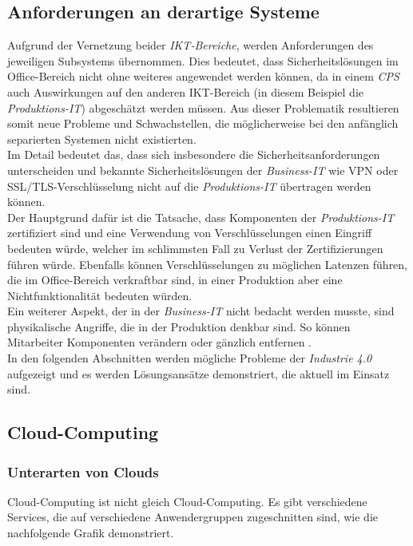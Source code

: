 \documentclass[conference]{IEEEtran}
\begin{document}
\subsection{Anforderungen an derartige Systeme}
Aufgrund der Vernetzung beider \textit{IKT-Bereiche}, werden Anforderungen des jeweiligen Subsystems übernommen. Dies bedeutet, dass Sicherheitslösungen im Office-Bereich nicht ohne weiteres angewendet werden können, da in einem \textit{CPS} auch Auswirkungen auf den anderen IKT-Bereich (in diesem Beispiel die \textit{Produktions-IT}) abgeschätzt werden müssen. Aus dieser Problematik resultieren somit neue Probleme und Schwachstellen, die möglicherweise bei den anfänglich separierten Systemen nicht existierten.\\
Im Detail bedeutet das, dass sich insbesondere die Sicherheitsanforderungen unterscheiden und bekannte Sicherheitslösungen der \textit{Business-IT} wie VPN oder SSL/TLS-Verschlüsselung nicht auf die \textit{Produktions-IT} übertragen werden können.\\
Der Hauptgrund dafür ist die Tatsache, dass Komponenten der \textit{Produktions-IT} zertifiziert sind und eine Verwendung von Verschlüsselungen einen Eingriff bedeuten würde, welcher im schlimmsten Fall zu Verlust der Zertifizierungen führen würde. Ebenfalls können Verschlüsselungen zu möglichen Latenzen führen, die im Office-Bereich verkraftbar sind, in einer Produktion aber eine Nichtfunktionalität bedeuten würden.\\
Ein weiterer Aspekt, der in der \textit{Business-IT} nicht bedacht werden musste, sind physikalische Angriffe, die in der Produktion denkbar sind. So können Mitarbeiter Komponenten verändern oder gänzlich entfernen \cite{eckert2015}.     
\vspace{0.3cm}
\\
In den folgenden Abschnitten werden mögliche Probleme der \textit{Industrie 4.0} aufgezeigt und es werden Lösungsansätze demonstriert, die aktuell im Einsatz sind.

\subsection{Cloud-Computing}

\subsubsection{Unterarten von Clouds}
Cloud-Computing ist nicht gleich Cloud-Computing. Es gibt verschiedene Services, die auf verschiedene Anwendergruppen zugeschnitten sind, wie die nachfolgende Grafik demonstriert.\\
\end{document}
